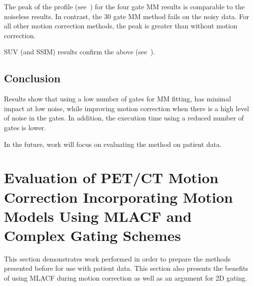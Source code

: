             The peak of the profile (see~) for the four gate \gls{MM} results is comparable to the noiseless results. In contrast, the $30$ gate \gls{MM} method fails on the noisy data. For all other motion correction methods, the peak is greater than without motion correction.
             
            \gls{SUV} (and \gls{SSIM}) results confirm the above (see~).

        \subsection{Conclusion} \label{sec:pet_ct_motion_correction_exploiting_motion_models_fit_on_coarsely_gated_data_applied_to_finely_gated_data_conclusion}
            Results show that using a low number of gates for \gls{MM} fitting, has minimal impact at low noise, while improving motion correction when there is a high level of noise in the gates. In addition, the execution time using a reduced number of gates is lower.
            
            In the future, work will focus on evaluating the method on patient data.

    \section{Evaluation of PET/CT Motion Correction Incorporating Motion Models Using MLACF and Complex Gating Schemes} \label{sec:evaluation_of_pet_ct_motion_correction_incorporating_motion_models_using_mlacf_and_complex_gating_schemes}
        This section demonstrates work performed in order to prepare the methods presented before for use with patient data. This section also presents the benefits of using \gls{MLACF} during motion correction as well as an argument for \gls{2D} gating.

